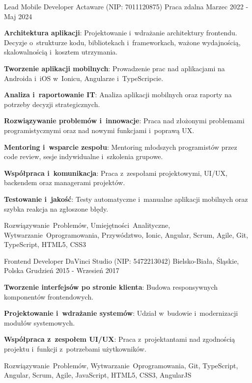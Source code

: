 \begin{cventries}
\cventry
{Lead Mobile Developer} %
{Actaware (NIP: 7011120875)} %
{Praca zdalna} %
{Marzec 2022 - Maj 2024} %
{
  \begin{cvitems} %
    \item {\textbf{Architektura aplikacji}: Projektowanie i~wdrażanie architektury frontendu. Decyzje o~strukturze kodu, bibliotekach i~frameworkach, ważone wydajnością, skalowalnością i~kosztem utrzymania.}
    \item {\textbf{Tworzenie aplikacji mobilnych}: Prowadzenie prac nad aplikacjami na Androida i~iOS w~Ionicu, Angularze i~TypeScripcie.}
    \item {\textbf{Analiza i~raportowanie IT}: Analiza aplikacji mobilnych oraz raporty na potrzeby decyzji strategicznych.}
    \item {\textbf{Rozwiązywanie problemów i~innowacje}: Praca nad złożonymi problemami programistycznymi oraz nad nowymi funkcjami i~poprawą UX.}
    \item {\textbf{Mentoring i~wsparcie zespołu}: Mentoring młodszych programistów przez code review, sesje indywidualne i~szkolenia grupowe.}
    \item {\textbf{Współpraca i~komunikacja}: Praca z~zespołami projektowymi, UI/UX, backendem oraz managerami projektów.}
    \item {\textbf{Testowanie i~jakość}: Testy automatyczne i~manualne aplikacji mobilnych oraz szybka reakcja na zgłoszone błędy.}
  \end{cvitems}
}
{Rozwiązywanie~Problemów, Umiejętności~Analityczne, Wytwarzanie~Oprogramowania, Przywództwo, Ionic, Angular, Scrum, Agile, Git, TypeScript, HTML5, CSS3}

\cventry
{Frontend Developer} %
{DaVinci Studio (NIP: 5472213042)} %
{Bielsko-Biała, Śląskie, Polska} %
{Grudzień 2015 - Wrzesień 2017} %
{
  \begin{cvitems} %
    \item {\textbf{Tworzenie interfejsów po stronie klienta}: Budowa responsywnych komponentów frontendowych.}
    \item {\textbf{Projektowanie i~wdrażanie systemów}: Udział w~budowie i~modernizacji modułów systemowych.}
    \item {\textbf{Współpraca z~zespołem UI/UX}: Praca z~projektantami nad zgodnością projektu i~funkcji z~potrzebami użytkowników.}
  \end{cvitems}
}
{Rozwiązywanie~Problemów, Wytwarzanie~Oprogramowania, Git, TypeScript, Angular, Scrum, Agile, JavaScript, HTML5, CSS3, AngularJS}


\end{cventries}
